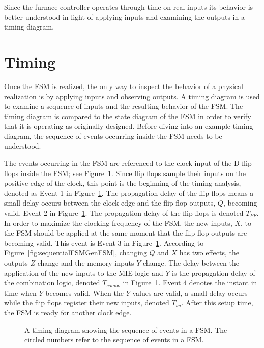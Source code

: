 Since the furnace controller operates through time on real
inputs its behavior is better understood in light of applying
inputs and examining the outputs in a timing diagram.

\section{Timing}
Once the FSM is realized, the only way to inspect the behavior of a physical
realization is by applying inputs and observing outputs.  A timing
diagram is used to examine a sequence of inputs and the resulting behavior of the FSM.
The timing diagram is compared to the state diagram of the FSM in order
to verify that it is operating as originally designed.  Before diving into an
example timing diagram,  the sequence of events
occurring  inside the FSM needs to be understood.

The events occurring in the FSM are referenced to the clock input of the
D flip flops inside the FSM; see Figure~\ref{fig:sequentialFSMGenTime}.  Since flip
flops sample their inputs on the positive edge of the clock, this point is the
beginning of the timing analysis, denoted as Event 1 in
Figure~\ref{fig:sequentialFSMGenTime}.  The propagation delay of the flip flops means
a small delay occurs between the clock edge and the flip flop outputs, $Q$,
becoming valid, Event 2 in Figure~\ref{fig:sequentialFSMGenTime}.  The propagation delay
of the flip flops is denoted $T_{FF}$.  In order to maximize the clocking
frequency of the FSM, the new inputs, $X$, to the FSM should be applied at the
same moment that the flip flop outputs are becoming valid.  This event is Event 3
in Figure~\ref{fig:sequentialFSMGenTime}. According to Figure~\ref{fig:sequentialFSMGenFSM}, changing
$Q$ and $X$ has two effects, the outputs $Z$ change and the memory
inputs $Y$ change.  The delay between the application of the new inputs to
the MIE logic and $Y$ is the propagation delay of the combination logic, denoted
$T_{combo}$ in Figure~\ref{fig:sequentialFSMGenTime}.  Event 4 denotes the instant in time
when $Y$ becomes valid.  When the $Y$ values are valid, a small
delay occurs while the flip flops register their new inputs, denoted $T_{su}$.  After
this setup time, the FSM is ready for another clock edge.

\begin{figure}[ht]

    \caption{A timing diagram showing the sequence of events in a FSM.
    The circled numbers refer to the sequence of events in a FSM.}
    \label{fig:sequentialFSMGenTime}

\end{figure}
\label{page:GenTime}

